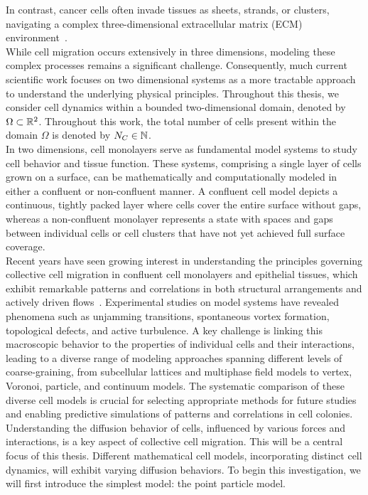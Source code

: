 In contrast, cancer cells often invade tissues as sheets, strands, or clusters, navigating a complex three-dimensional extracellular matrix (ECM) environment~\cite{friedl2009, cai2014, clark2015}. \\
While cell migration occurs extensively in three dimensions, modeling these complex processes remains a significant challenge. 
Consequently, much current scientific work focuses on two dimensional systems as a more tractable approach to understand the underlying physical principles.
Throughout this thesis, we consider cell dynamics within a bounded two-dimensional domain, denoted by $\Omega \subset \mathbb{R}^2$. 
Throughout this work, the total number of cells present within the domain $\Omega$ is denoted by $N_C \in \mathbb{N}$. \\
In two dimensions, cell monolayers serve as fundamental model systems to study cell behavior and tissue function. 
These systems, comprising a single layer of cells grown on a surface, can be mathematically and computationally modeled in either a confluent or non-confluent manner. 
A confluent cell model depicts a continuous, tightly packed layer where cells cover the entire surface without gaps, whereas a non-confluent monolayer represents a state with spaces and gaps between individual cells or cell clusters that have not yet achieved full surface coverage. \\
Recent years have seen growing interest in understanding the principles governing collective cell migration in confluent cell monolayers and epithelial tissues, which exhibit remarkable patterns and correlations in both structural arrangements and actively driven flows~\cite{wenzel2021}. 
Experimental studies on model systems have revealed phenomena such as unjamming transitions, spontaneous vortex formation, topological defects, and active turbulence. 
A key challenge is linking this macroscopic behavior to the properties of individual cells and their interactions, leading to a diverse range of modeling approaches spanning different levels of coarse-graining, from subcellular lattices and multiphase field models to vertex, Voronoi, particle, and continuum models. 
The systematic comparison of these diverse cell models is crucial for selecting appropriate methods for future studies and enabling predictive simulations of patterns and correlations in cell colonies. \\
Understanding the diffusion behavior of cells, influenced by various forces and interactions, is a key aspect of collective cell migration. This will be a central focus of this thesis. Different mathematical cell models, incorporating distinct cell dynamics, will exhibit varying diffusion behaviors. To begin this investigation, we will first introduce the simplest model: the point particle model. \\

